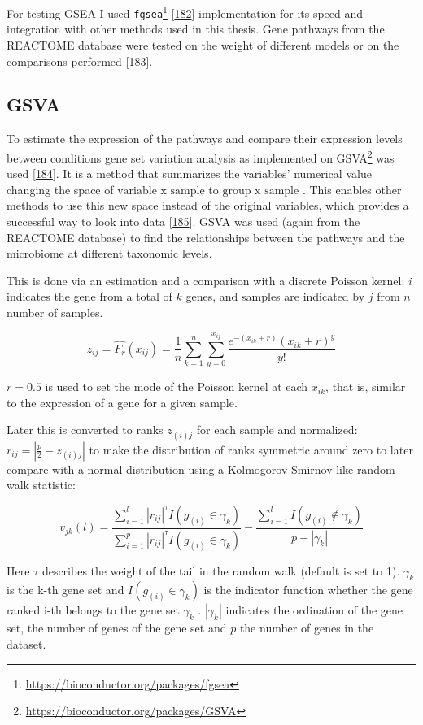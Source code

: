 \documentclass[
  a4paper,
]{book}
\DeclareRobustCommand{\href}[2]{#2\footnote{\url{#1}}}
\begin{document}
For testing GSEA I used \href{https://bioconductor.org/packages/fgsea}{\texttt{fgsea}} {[}\protect\hyperlink{ref-korotkevich2021}{182}{]} implementation for its speed and integration with other methods used in this thesis.
Gene pathways from the REACTOME database were tested on the weight of different models or on the comparisons performed {[}\protect\hyperlink{ref-fabregat2016}{183}{]}.

\hypertarget{gsva}{%
\subsection{GSVA}\label{gsva}}

To estimate the expression of the pathways and compare their expression levels between conditions gene set variation analysis as implemented on \href{https://bioconductor.org/packages/GSVA}{GSVA} was used {[}\protect\hyperlink{ref-huxe4nzelmann2013}{184}{]}.
It is a method that summarizes the variables' numerical value changing the space of \(\text{variable x sample}\) to \(\text{group x sample}\) .
This enables other methods to use this new space instead of the original variables, which provides a successful way to look into data {[}\protect\hyperlink{ref-escudero-hernuxe1ndez2021}{185}{]}.
GSVA was used (again from the REACTOME database) to find the relationships between the pathways and the microbiome at different taxonomic levels.

This is done via an estimation and a comparison with a discrete Poisson kernel: \(i\) indicates the gene from a total of \(k\) genes, and samples are indicated by \(j\) from \(n\) number of samples.

\[
z_{ij}=\hat{F_r}(x_{ij}) = \frac{1}{n}\sum_{k=1}^n\sum_{y=0}^{x_{ij}}\dfrac{e^{-(x_{ik}+r)}(x_{ik} + r)^y }{y!}
\]

\(r = 0.5\) is used to set the mode of the Poisson kernel at each \(x_{ik}\), that is, similar to the expression of a gene for a given sample.

Later this is converted to ranks \(z_{(i)j}\) for each sample and normalized: \(r_{ij}=|\frac{p}{2}-z_{(i)j}|\) to make the distribution of ranks symmetric around zero to later compare with a normal distribution using a Kolmogorov-Smirnov-like random walk statistic:

\[
v_{jk}(l)=\dfrac{\sum_{i=1}^l|r_{ij}|^{\tau}I(g_{(i)}\in \gamma_k)}{\sum_{i=1}^p|r_{ij}|^{\tau}I(g_{(i)} \in \gamma_k)}
- \dfrac{\sum_{i=1}^lI(g_{(i)} \not \in\gamma_k)}{p-|\gamma_k|}
\]

Here \(\tau\) describes the weight of the tail in the random walk (default is set to 1).
\(\gamma_k\) is the k-th gene set and \(I(g_{(i)}\in \gamma_k)\) is the indicator function whether the gene ranked i-th belongs to the gene set \(\gamma_k\) .
\(|\gamma_k|\) indicates the ordination of the gene set, the number of genes of the gene set and \(p\) the number of genes in the dataset.
\end{document}
